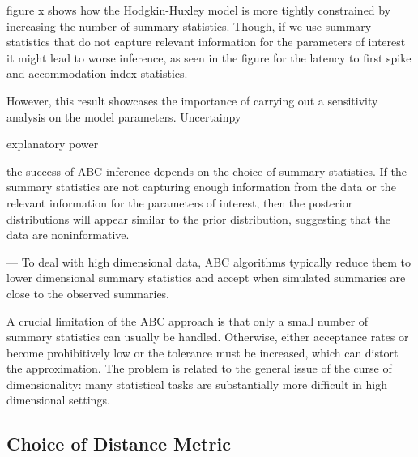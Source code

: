 figure x shows how the Hodgkin-Huxley model is more tightly constrained by increasing the number of summary statistics. Though, if we use summary statistics that do not capture relevant information for the parameters of interest it might lead to worse inference, as seen in the figure for the latency to first spike and accommodation index statistics.  

However, this result showcases the importance of carrying out a sensitivity analysis on the model parameters. Uncertainpy

explanatory power

the success of ABC inference depends on the choice of summary statistics. If the summary statistics are not capturing enough information from the data or the relevant information for the parameters of interest, then the posterior distributions will appear similar to the prior distribution, suggesting that the data are noninformative. 

--- 
To deal with high dimensional data, ABC algorithms typically reduce them to lower dimensional summary statistics and accept when simulated summaries are close to the observed summaries. 

A crucial limitation of the ABC approach is that only a small number of summary statistics can usually be handled. Otherwise, either acceptance rates or become prohibitively low or the tolerance must be increased, which can distort the approximation. The problem is related to the general issue of the curse of dimensionality: many statistical tasks are substantially more difficult in high dimensional settings. 


\subsection{Choice of Distance Metric}

